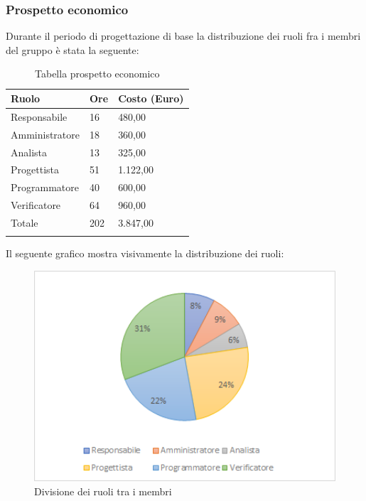 \subsubsection{Prospetto economico}
Durante il periodo di progettazione di base la distribuzione dei ruoli fra i membri del gruppo è stata la seguente:
\begin{center}
	\renewcommand{\arraystretch}{1.5}
	\begin{longtable}[H]{  p{5.6cm}  p{3cm} p{3cm}  }
		\rowcolor{tableHeadYellow}
		\textbf{Ruolo}   & \textbf{Ore} & \textbf{Costo (Euro)} \\ 
		\endhead
		Responsabile   & 16   & 480,00 \\
		Amministratore & 18   & 360,00 \\
		Analista       & 13   & 325,00 \\
		Progettista    & 51   & 1.122,00 \\
		Programmatore  & 40   & 600,00 \\
		Verificatore   & 64   & 960,00 \\
		Totale         & 202  & 3.847,00 \\
		\rowcolor{white}
		\caption{Tabella prospetto economico}
	\end{longtable}
\end{center}
Il seguente grafico mostra visivamente la distribuzione dei ruoli:
\begin{figure}[H]
	\centering
	\includegraphics[width=15cm,keepaspectratio]{../includes/pics/grafici/grafico6.png}
	\caption{\label{fig:mission}Divisione dei ruoli tra i membri}
\end{figure}
\clearpage
